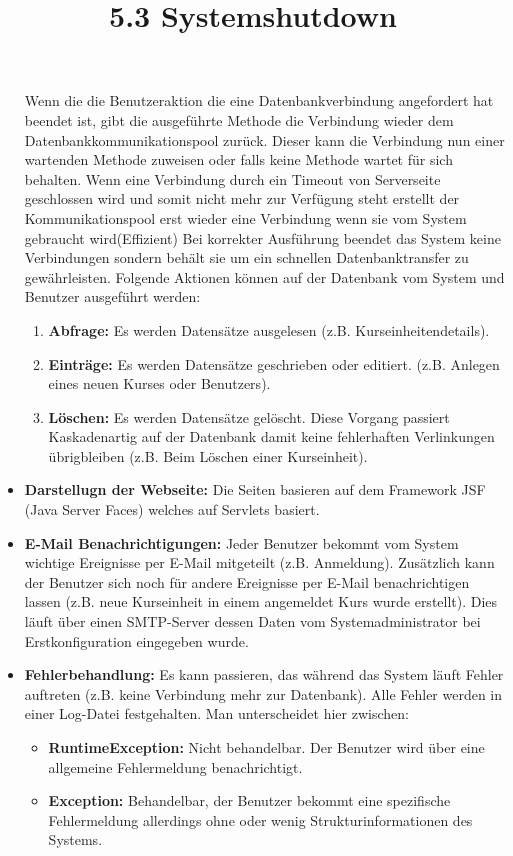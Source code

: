 \begin{itemize}
\begin{enumerate}
			\end{enumerate}
			Wenn die die Benutzeraktion die eine Datenbankverbindung angefordert hat beendet ist, gibt die ausgeführte Methode die Verbindung wieder dem Datenbankkommunikationspool zurück. Dieser kann die Verbindung nun einer wartenden Methode zuweisen oder falls keine Methode wartet für sich behalten. Wenn eine Verbindung durch ein Timeout von Serverseite geschlossen wird und somit nicht mehr zur Verfügung steht erstellt der Kommunikationspool erst wieder eine Verbindung wenn sie vom System gebraucht wird(Effizient) Bei korrekter Ausführung beendet das System keine Verbindungen sondern behält sie um ein schnellen Datenbanktransfer zu gewährleisten. Folgende Aktionen können auf der Datenbank vom System und Benutzer ausgeführt werden:
			\begin{enumerate}
				\item \textbf{Abfrage:} 
				Es werden Datensätze ausgelesen (z.B. Kurseinheitendetails).
				\item \textbf{Einträge:}
				 Es werden Datensätze geschrieben oder editiert. (z.B. Anlegen eines neuen Kurses oder Benutzers).
				\item \textbf{Löschen:} 
				Es werden Datensätze gelöscht. Diese Vorgang passiert Kaskadenartig auf der Datenbank damit keine fehlerhaften Verlinkungen übrigbleiben (z.B. Beim Löschen einer Kurseinheit).
				
			\end{enumerate}
			
			\item \textbf{Darstellugn der Webseite:} 
			Die Seiten basieren auf dem Framework JSF (Java Server Faces) welches auf Servlets basiert. 
			
			\item \textbf{E-Mail Benachrichtigungen:} Jeder Benutzer bekommt vom System wichtige Ereignisse per E-Mail mitgeteilt (z.B. Anmeldung). Zusätzlich kann der Benutzer sich noch für andere Ereignisse per E-Mail benachrichtigen lassen (z.B. neue Kurseinheit in einem angemeldet Kurs wurde erstellt). Dies läuft über einen SMTP-Server dessen Daten vom Systemadministrator bei Erstkonfiguration eingegeben wurde.
			
			\item \textbf{Fehlerbehandlung:} 
			Es kann passieren, das während das System läuft Fehler auftreten (z.B. keine Verbindung mehr zur Datenbank). Alle Fehler werden in einer Log-Datei festgehalten. Man unterscheidet hier zwischen:
			\begin{itemize}
				\item \textbf{RuntimeException:} Nicht behandelbar. Der Benutzer wird über eine allgemeine Fehlermeldung benachrichtigt.
				\item \textbf{Exception:} Behandelbar, der Benutzer bekommt eine spezifische Fehlermeldung allerdings ohne oder wenig Strukturinformationen des Systems.
				\end{itemize}
			
		\end{itemize} 
	
	\title{5.3 Systemshutdown}
   